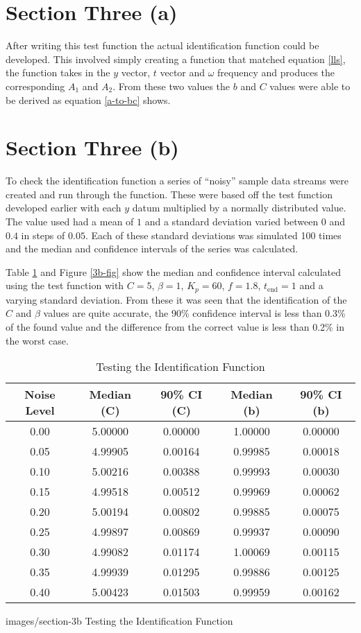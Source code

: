 \section*{Section Three (a)}

After writing this test function the actual identification function could be
developed.  This involved simply creating a function that matched equation
\ref{lls}, the function takes in the $y$ vector, $t$ vector and $\omega$
frequency and produces the corresponding $A_1$ and $A_2$.  From these two values
the $b$ and $C$ values were able to be derived as equation \ref{a-to-bc} shows.

\section*{Section Three (b)}

To check the identification function a series of ``noisy'' sample data streams
were created and run through the function.  These were based off the test function
developed earlier with each $y$ datum multiplied by a normally distributed
value.  The value used had a mean of $1$ and a standard deviation varied between
$0$ and $0.4$ in steps of $0.05$.  Each of these standard deviations was
simulated 100 times and the median and confidence intervals of the series was
calculated.

Table \ref{3b} and Figure \ref{3b-fig} show the median and confidence interval
calculated using the test function with $C = 5$, $\beta = 1$, $K_p = 60$, $f =
1.8$, $t_\text{end} = 1$ and a varying standard deviation.  From these it was
seen that the identification of the $C$ and $\beta$ values are quite accurate,
the 90\% confidence interval is less than 0.3\% of the found value and the
difference from the correct value is less than 0.2\% in the worst case.

\begin{table}
\centering
\begin{tabular}{c|c|c|c|c}
Noise Level & Median (C) & 90\% CI (C) & Median (b) & 90\% CI (b) \\
\hline
0.00 & 5.00000 & 0.00000 & 1.00000 & 0.00000 \\
0.05 & 4.99905 & 0.00164 & 0.99985 & 0.00018 \\
0.10 & 5.00216 & 0.00388 & 0.99993 & 0.00030 \\
0.15 & 4.99518 & 0.00512 & 0.99969 & 0.00062 \\
0.20 & 5.00194 & 0.00802 & 0.99885 & 0.00075 \\
0.25 & 4.99897 & 0.00869 & 0.99937 & 0.00090 \\
0.30 & 4.99082 & 0.01174 & 1.00069 & 0.00115 \\
0.35 & 4.99939 & 0.01295 & 0.99886 & 0.00125 \\
0.40 & 5.00423 & 0.01503 & 0.99959 & 0.00162  
\end{tabular}
\caption{Testing the Identification Function\label{3b}}
\end{table}

              {images/section-3b}
              {Testing the Identification Function\label{3b-fig}}
